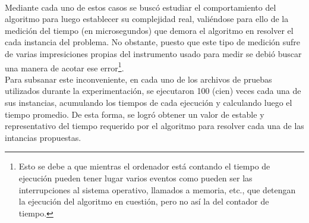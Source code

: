 \paragraph{}
Mediante cada uno de estos casos se buscó estudiar el comportamiento del algoritmo para luego establecer su complejidad real, valiéndose para ello de la medición del tiempo (en microsegundos) que demora el algoritmo en resolver el cada instancia del problema. 
No obstante, puesto que este tipo de medición sufre de varias impresiciones propias del instrumento usado para medir se debió buscar una manera de acotar ese error\footnote{Esto se debe a que mientras el ordenador está contando el tiempo de ejecución pueden tener lugar varios eventos como pueden ser las interrupciones al sistema operativo, llamados a memoria, etc., que detengan la ejecución del algoritmo en cuestión, pero no así la del contador de tiempo.}. \\
Para subsanar este inconveniente, en cada uno de los archivos de pruebas utilizados durante la experimentación, se ejecutaron 100 (cien) veces cada una de sus instancias, acumulando los tiempos de cada ejecución y calculando luego el tiempo promedio. De esta forma, se logró obtener un valor de estable y representativo del tiempo requerido por el algoritmo para resolver cada una de las intancias propuestas.

